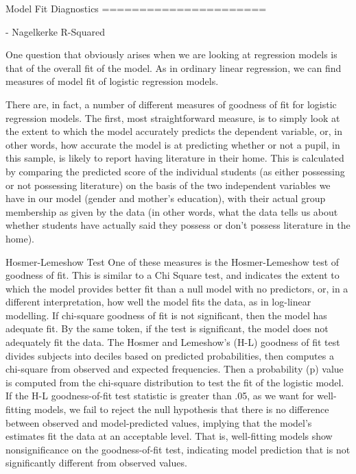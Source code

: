 Model Fit Diagnostics
======================

- Nagelkerke R-Squared


One question that obviously arises when we are looking at regression models is that of the overall fit of the model. As in ordinary linear regression, we can find measures of model fit of logistic regression models.

There are, in fact, a number of different measures of goodness of fit for logistic regression models. The first, most straightforward measure, is to simply look at the extent to which the model accurately predicts the dependent variable, or, in other words, how accurate the model is at predicting whether or not a pupil, in this sample, is likely to report having literature in their home. This is calculated by comparing the predicted score of the individual students (as either possessing or not possessing literature) on the basis of the two independent variables we have in our model (gender and mother’s education), with their actual group membership as given by the data (in other words, what the data tells us about whether students have actually said they possess or don’t possess literature in the home). 

Hosmer-Lemeshow Test
 One of these measures is the Hosmer-Lemeshow test of goodness of fit. This is similar to a Chi Square test, and indicates the extent to which the model provides better fit than a null model with no predictors, or, in a different interpretation, how well the model fits the data, as in log-linear modelling. If chi-square goodness of fit is not significant, then the model has adequate fit. By the same token, if the test is significant, the model does not adequately fit the data. The Hosmer and Lemeshow's (H-L) goodness of fit test divides subjects into deciles based on predicted probabilities, then computes a chi-square from observed and expected frequencies. Then a probability (p) value is computed from the chi-square distribution to test the fit of the logistic model. If the H-L goodness-of-fit test statistic is greater than .05, as we want for well-fitting models, we fail to reject the null hypothesis that there is no difference between observed and model-predicted values, implying that the model's estimates fit the data at an acceptable level. That is, well-fitting models show nonsignificance on the goodness-of-fit test, indicating model prediction that is not significantly different from observed values.

